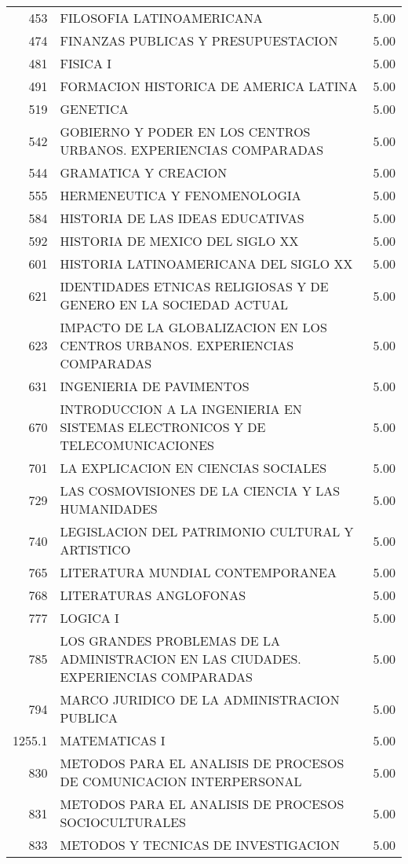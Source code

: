 \documentclass[12pt]{article}
\begin{document}
\begin{table}[ht]
{\begin{tabular}{rlr}
  453 & FILOSOFIA LATINOAMERICANA & 5.00 \\ 
  474 & FINANZAS PUBLICAS Y PRESUPUESTACION & 5.00 \\ 
  481 & FISICA I & 5.00 \\ 
  491 & FORMACION HISTORICA DE AMERICA LATINA & 5.00 \\ 
  519 & GENETICA & 5.00 \\ 
  542 & GOBIERNO Y PODER EN LOS CENTROS URBANOS. EXPERIENCIAS COMPARADAS & 5.00 \\ 
  544 & GRAMATICA Y CREACION & 5.00 \\ 
  555 & HERMENEUTICA Y FENOMENOLOGIA & 5.00 \\ 
  584 & HISTORIA DE LAS IDEAS EDUCATIVAS & 5.00 \\ 
  592 & HISTORIA DE MEXICO DEL SIGLO XX & 5.00 \\ 
  601 & HISTORIA LATINOAMERICANA DEL SIGLO XX & 5.00 \\ 
  621 & IDENTIDADES ETNICAS RELIGIOSAS Y DE GENERO EN LA SOCIEDAD ACTUAL & 5.00 \\ 
  623 & IMPACTO DE LA GLOBALIZACION EN LOS CENTROS URBANOS. EXPERIENCIAS COMPARADAS & 5.00 \\ 
  631 & INGENIERIA DE PAVIMENTOS & 5.00 \\ 
  670 & INTRODUCCION A LA INGENIERIA EN SISTEMAS ELECTRONICOS Y DE TELECOMUNICACIONES & 5.00 \\ 
  701 & LA EXPLICACION EN CIENCIAS SOCIALES & 5.00 \\ 
  729 & LAS COSMOVISIONES DE LA CIENCIA Y LAS HUMANIDADES & 5.00 \\ 
  740 & LEGISLACION DEL PATRIMONIO CULTURAL Y ARTISTICO & 5.00 \\ 
  765 & LITERATURA MUNDIAL CONTEMPORANEA & 5.00 \\ 
  768 & LITERATURAS ANGLOFONAS & 5.00 \\ 
  777 & LOGICA I & 5.00 \\ 
  785 & LOS GRANDES PROBLEMAS DE LA ADMINISTRACION EN LAS CIUDADES. EXPERIENCIAS COMPARADAS & 5.00 \\ 
  794 & MARCO JURIDICO DE LA ADMINISTRACION PUBLICA & 5.00 \\ 
  1255.1 & MATEMATICAS I & 5.00 \\ 
  830 & METODOS PARA EL ANALISIS DE PROCESOS DE COMUNICACION INTERPERSONAL & 5.00 \\ 
  831 & METODOS PARA EL ANALISIS DE PROCESOS SOCIOCULTURALES & 5.00 \\ 
  833 & METODOS Y TECNICAS DE INVESTIGACION & 5.00 \\ 

\end{tabular}}
\end{table}
\end{document}
